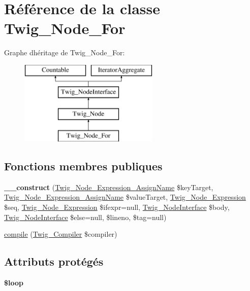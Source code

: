 \hypertarget{class_twig___node___for}{}\section{Référence de la classe Twig\+\_\+\+Node\+\_\+\+For}
\label{class_twig___node___for}
Graphe d\textquotesingle{}héritage de Twig\+\_\+\+Node\+\_\+\+For\+:\begin{figure}[H]
\begin{center}
\leavevmode
\includegraphics[height=4.000000cm]{class_twig___node___for}
\end{center}
\end{figure}
\subsection*{Fonctions membres publiques}
\begin{DoxyCompactItemize}
\item 
{\bfseries \+\_\+\+\_\+construct} (\hyperlink{class_twig___node___expression___assign_name}{Twig\+\_\+\+Node\+\_\+\+Expression\+\_\+\+Assign\+Name} \$key\+Target, \hyperlink{class_twig___node___expression___assign_name}{Twig\+\_\+\+Node\+\_\+\+Expression\+\_\+\+Assign\+Name} \$value\+Target, \hyperlink{class_twig___node___expression}{Twig\+\_\+\+Node\+\_\+\+Expression} \$seq, \hyperlink{class_twig___node___expression}{Twig\+\_\+\+Node\+\_\+\+Expression} \$ifexpr=null, \hyperlink{interface_twig___node_interface}{Twig\+\_\+\+Node\+Interface} \$body, \hyperlink{interface_twig___node_interface}{Twig\+\_\+\+Node\+Interface} \$else=null, \$lineno, \$tag=null)\hypertarget{class_twig___node___for_ad34a0520c567b99c329b7749c00dbea1}{}\label{class_twig___node___for_ad34a0520c567b99c329b7749c00dbea1}

\item 
\hyperlink{class_twig___node___for_a4e0faa87c3fae583620b84d3607085da}{compile} (\hyperlink{class_twig___compiler}{Twig\+\_\+\+Compiler} \$compiler)
\end{DoxyCompactItemize}
\subsection*{Attributs protégés}
\begin{DoxyCompactItemize}
\item 
{\bfseries \$loop}\hypertarget{class_twig___node___for_ae7d53f6b57a5cd2cec9cadec7e80910a}{}\label{class_twig___node___for_ae7d53f6b57a5cd2cec9cadec7e80910a}

\end{DoxyCompactItemize}


